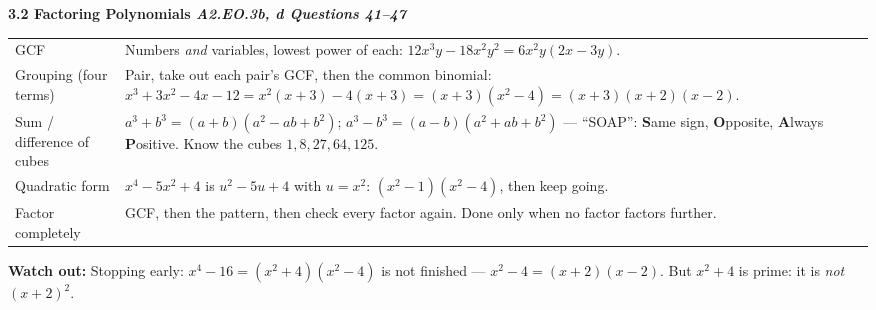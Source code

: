 \documentclass[10pt]{article}
\newcommand{\sghead}[2]{%
  \boxguard[10]%
  \vspace{4pt}\par\noindent
  \colorbox{forest}{\parbox{\dimexpr\linewidth-2\fboxsep}{%
    \small\color{white}\bfseries #1 \hfill \textmd{\itshape\scriptsize\color{forestmid} #2}}}%
  \vspace{2pt}\par}
\newcommand{\sgwatch}[1]{%
  \vspace{1pt}\par\noindent
  \colorbox{redbg}{\parbox{\dimexpr\linewidth-2\fboxsep}{%
    \footnotesize\textbf{\textcolor{redacc}{Watch out:}} #1}}%
  \vspace{1pt}\par}
\newcommand{\sgtabsetup}{\renewcommand{\arraystretch}{1.06}\footnotesize}
\begin{document}
\sghead{3.2 \quad Factoring Polynomials}{A2.EO.3b, d \;\textbullet\; Questions 41--47}
{\sgtabsetup
\begin{tabularx}{\linewidth}{@{} G X @{}}
GCF & Numbers \emph{and} variables, lowest power of each: $12x^3y-18x^2y^2=6x^2y(2x-3y)$. \\
Grouping (four terms) & Pair, take out each pair's GCF, then the common binomial:
  $x^3+3x^2-4x-12=x^2(x+3)-4(x+3)=(x+3)(x^2-4)=(x+3)(x+2)(x-2)$. \\
Sum / difference of cubes & $a^3+b^3=(a+b)(a^2-ab+b^2)$; $a^3-b^3=(a-b)(a^2+ab+b^2)$ ---
  ``SOAP'': \textbf{S}ame sign, \textbf{O}pposite, \textbf{A}lways \textbf{P}ositive. Know the
  cubes $1,8,27,64,125$. \\
Quadratic form & $x^4-5x^2+4$ is $u^2-5u+4$ with $u=x^2$: $(x^2-1)(x^2-4)$, then keep going. \\
Factor completely & GCF, then the pattern, then check every factor again. Done only when no factor
  factors further. \\
\end{tabularx}}
\sgwatch{Stopping early: $x^4-16=(x^2+4)(x^2-4)$ is not finished --- $x^2-4=(x+2)(x-2)$. But
$x^2+4$ is prime: it is \emph{not} $(x+2)^2$.}
\end{document}
